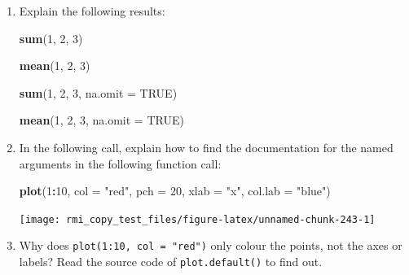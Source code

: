 \documentclass[]{book}
\newenvironment{Shaded}{\begin{snugshade}}{\end{snugshade}}
\newcommand{\KeywordTok}[1]{\textcolor[rgb]{0.13,0.29,0.53}{\textbf{#1}}}
\newcommand{\DataTypeTok}[1]{\textcolor[rgb]{0.13,0.29,0.53}{#1}}
\newcommand{\DecValTok}[1]{\textcolor[rgb]{0.00,0.00,0.81}{#1}}
\newcommand{\StringTok}[1]{\textcolor[rgb]{0.31,0.60,0.02}{#1}}
\newcommand{\OtherTok}[1]{\textcolor[rgb]{0.56,0.35,0.01}{#1}}
\newcommand{\OperatorTok}[1]{\textcolor[rgb]{0.81,0.36,0.00}{\textbf{#1}}}
\newcommand{\NormalTok}[1]{#1}
\theoremstyle{definition}
\theoremstyle{definition}
\theoremstyle{definition}
\theoremstyle{remark}
\begin{document}
\begin{enumerate}
\def\labelenumi{\arabic{enumi}.}
\item
  Explain the following results:

\begin{Shaded}
\begin{Highlighting}[]
\KeywordTok{sum}\NormalTok{(}\DecValTok{1}\NormalTok{, }\DecValTok{2}\NormalTok{, }\DecValTok{3}\NormalTok{)}
\end{Highlighting}
\end{Shaded}

\begin{Shaded}
\begin{Highlighting}[]
\KeywordTok{mean}\NormalTok{(}\DecValTok{1}\NormalTok{, }\DecValTok{2}\NormalTok{, }\DecValTok{3}\NormalTok{)}
\end{Highlighting}
\end{Shaded}

\begin{Shaded}
\begin{Highlighting}[]
\KeywordTok{sum}\NormalTok{(}\DecValTok{1}\NormalTok{, }\DecValTok{2}\NormalTok{, }\DecValTok{3}\NormalTok{, }\DataTypeTok{na.omit =} \OtherTok{TRUE}\NormalTok{)}
\end{Highlighting}
\end{Shaded}

\begin{Shaded}
\begin{Highlighting}[]
\KeywordTok{mean}\NormalTok{(}\DecValTok{1}\NormalTok{, }\DecValTok{2}\NormalTok{, }\DecValTok{3}\NormalTok{, }\DataTypeTok{na.omit =} \OtherTok{TRUE}\NormalTok{)}
\end{Highlighting}
\end{Shaded}
\item
  In the following call, explain how to find the documentation for the
  named arguments in the following function call:

\begin{Shaded}
\begin{Highlighting}[]
\KeywordTok{plot}\NormalTok{(}\DecValTok{1}\OperatorTok{:}\DecValTok{10}\NormalTok{, }\DataTypeTok{col =} \StringTok{"red"}\NormalTok{, }\DataTypeTok{pch =} \DecValTok{20}\NormalTok{, }\DataTypeTok{xlab =} \StringTok{"x"}\NormalTok{, }\DataTypeTok{col.lab =} \StringTok{"blue"}\NormalTok{)}
\end{Highlighting}
\end{Shaded}

  \begin{center}\texttt{[image: rmi\_copy\_test\_files/figure-latex/unnamed-chunk-243-1]} \end{center}
\item
  Why does \texttt{plot(1:10,\ col\ =\ "red")} only colour the points,
  not the axes or labels? Read the source code of
  \texttt{plot.default()} to find out.
\end{enumerate}
\end{document}
